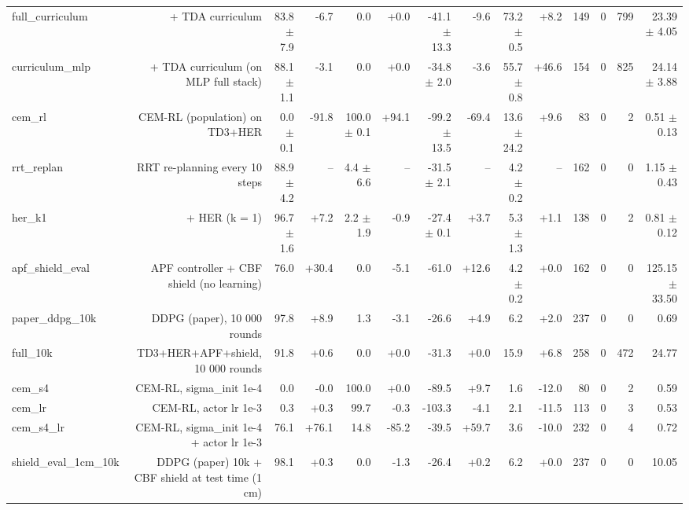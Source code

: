 \begin{table}[t]
\begin{tabular}{lrrrrrrrrrrrrr}
full\_curriculum & + TDA curriculum & 83.8 $\pm$ 7.9 & -6.7 & 0.0 & +0.0 & -41.1 $\pm$ 13.3 & -9.6 & 73.2 $\pm$ 0.5 & +8.2 & 149 & 0 & 799 & 23.39 $\pm$ 4.05 \\
curriculum\_mlp & + TDA curriculum (on MLP full stack) & 88.1 $\pm$ 1.1 & -3.1 & 0.0 & +0.0 & -34.8 $\pm$ 2.0 & -3.6 & 55.7 $\pm$ 0.8 & +46.6 & 154 & 0 & 825 & 24.14 $\pm$ 3.88 \\
cem\_rl & CEM-RL (population) on TD3+HER & 0.0 $\pm$ 0.1 & -91.8 & 100.0 $\pm$ 0.1 & +94.1 & -99.2 $\pm$ 13.5 & -69.4 & 13.6 $\pm$ 24.2 & +9.6 & 83 & 0 & 2 & 0.51 $\pm$ 0.13 \\
rrt\_replan & RRT re-planning every 10 steps & 88.9 $\pm$ 4.2 & -- & 4.4 $\pm$ 6.6 & -- & -31.5 $\pm$ 2.1 & -- & 4.2 $\pm$ 0.2 & -- & 162 & 0 & 0 & 1.15 $\pm$ 0.43 \\
her\_k1 & + HER (k = 1) & 96.7 $\pm$ 1.6 & +7.2 & 2.2 $\pm$ 1.9 & -0.9 & -27.4 $\pm$ 0.1 & +3.7 & 5.3 $\pm$ 1.3 & +1.1 & 138 & 0 & 2 & 0.81 $\pm$ 0.12 \\
apf\_shield\_eval & APF controller + CBF shield (no learning) & 76.0 & +30.4 & 0.0 & -5.1 & -61.0 & +12.6 & 4.2 $\pm$ 0.2 & +0.0 & 162 & 0 & 0 & 125.15 $\pm$ 33.50 \\
paper\_ddpg\_10k & DDPG (paper), 10 000 rounds & 97.8 & +8.9 & 1.3 & -3.1 & -26.6 & +4.9 & 6.2 & +2.0 & 237 & 0 & 0 & 0.69 \\
full\_10k & TD3+HER+APF+shield, 10 000 rounds & 91.8 & +0.6 & 0.0 & +0.0 & -31.3 & +0.0 & 15.9 & +6.8 & 258 & 0 & 472 & 24.77 \\
cem\_s4 & CEM-RL, sigma\_init 1e-4 & 0.0 & -0.0 & 100.0 & +0.0 & -89.5 & +9.7 & 1.6 & -12.0 & 80 & 0 & 2 & 0.59 \\
cem\_lr & CEM-RL, actor lr 1e-3 & 0.3 & +0.3 & 99.7 & -0.3 & -103.3 & -4.1 & 2.1 & -11.5 & 113 & 0 & 3 & 0.53 \\
cem\_s4\_lr & CEM-RL, sigma\_init 1e-4 + actor lr 1e-3 & 76.1 & +76.1 & 14.8 & -85.2 & -39.5 & +59.7 & 3.6 & -10.0 & 232 & 0 & 4 & 0.72 \\
shield\_eval\_1cm\_10k & DDPG (paper) 10k + CBF shield at test time (1 cm) & 98.1 & +0.3 & 0.0 & -1.3 & -26.4 & +0.2 & 6.2 & +0.0 & 237 & 0 & 0 & 10.05 \\
\bottomrule
\end{tabular}
\end{table}